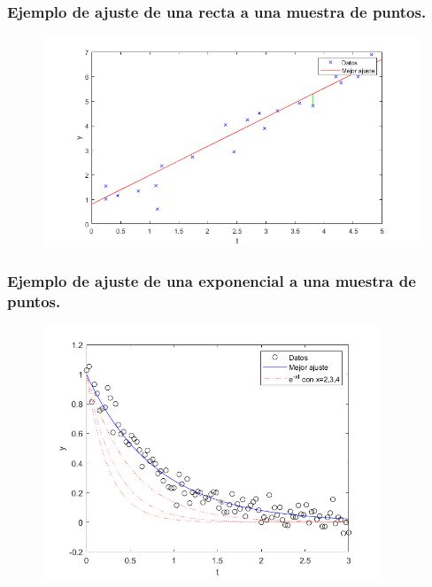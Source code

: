 \documentclass{beamer}
\begin{document}
\begin{frame}
    \frametitle{Ejemplo de ajuste de una recta a una muestra de puntos.}
    \begin{figure}[h]
        \centering
        \includegraphics[width=1\textwidth]{imgs/examplelsqlin.png}
    \end{figure}
\end{frame}

\begin{frame}
    \frametitle{Ejemplo de ajuste de una exponencial a una muestra de puntos.}
    \begin{figure}[h]
        \centering
        \includegraphics[width=0.9\textwidth]{imgs/exp.png}
    \end{figure}
\end{frame}
\end{document}
